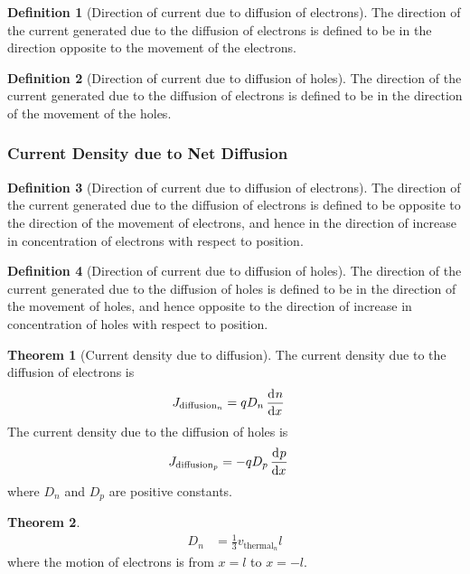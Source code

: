 \documentclass[titlepage, fleqn, a4paper, 12pt, twoside]{article}
\theoremstyle{definition}
\newtheorem{definition}{Definition}
\theoremstyle{theorem}
\newtheorem{theorem}{Theorem}
\begin{document}
\begin{definition}[Direction of current due to diffusion of electrons]
	The direction of the current generated due to the diffusion of electrons is defined to be in the direction opposite to the movement of the electrons.
\end{definition}

\begin{definition}[Direction of current due to diffusion of holes]
	The direction of the current generated due to the diffusion of electrons is defined to be in the direction of the movement of the holes.
\end{definition}

\subsubsection{Current Density due to Net Diffusion}

\begin{definition}[Direction of current due to diffusion of electrons]
	The direction of the current generated due to the diffusion of electrons is defined to be opposite to the direction of the movement of electrons, and hence in the direction of increase in concentration of electrons with respect to position.
\end{definition}

\begin{definition}[Direction of current due to diffusion of holes]
	The direction of the current generated due to the diffusion of holes is defined to be in the direction of the movement of holes, and hence opposite to the direction of increase in concentration of holes with respect to position.
\end{definition}

\begin{theorem}[Current density due to diffusion]
	The current density due to the diffusion of electrons is
	\begin{align*}
		J_{\text{diffusion}_n} &= q D_n \dod{n}{x}
	\end{align*}
	The current density due to the diffusion of holes is
	\begin{align*}
		J_{\text{diffusion}_p} &= -q D_p \dod{p}{x}
	\end{align*}
	where $D_n$ and $D_p$ are positive constants.
\end{theorem}

\begin{theorem}
	\begin{align*}
		D_n &= \frac{1}{3} v_{\text{thermal}_n} l
	\end{align*}
	where the motion of electrons is from $x = l$ to $x = -l$.
\end{theorem}
\end{document}
